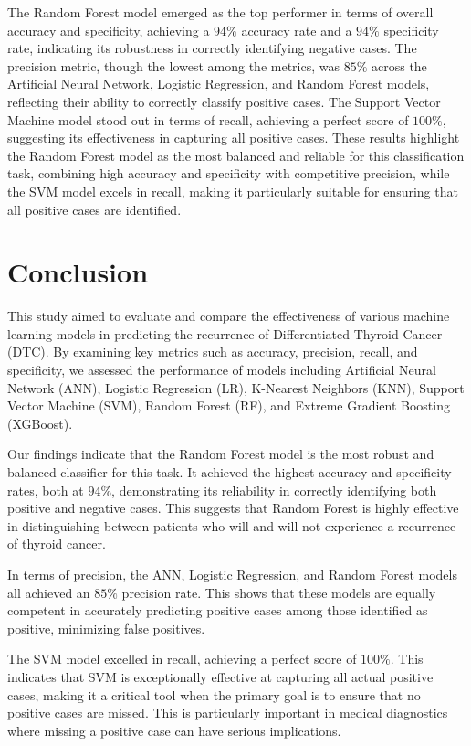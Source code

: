 \documentclass[
  letterpaper,
  DIV=11,
  numbers=noendperiod]{scrartcl}
\begin{document}
The Random Forest model emerged as the top performer in terms of overall
accuracy and specificity, achieving a \(94\%\) accuracy rate and a
\(94\%\) specificity rate, indicating its robustness in correctly
identifying negative cases. The precision metric, though the lowest
among the metrics, was \(85\%\) across the Artificial Neural Network,
Logistic Regression, and Random Forest models, reflecting their ability
to correctly classify positive cases. The Support Vector Machine model
stood out in terms of recall, achieving a perfect score of \(100\%\),
suggesting its effectiveness in capturing all positive cases. These
results highlight the Random Forest model as the most balanced and
reliable for this classification task, combining high accuracy and
specificity with competitive precision, while the SVM model excels in
recall, making it particularly suitable for ensuring that all positive
cases are identified.

\section{Conclusion}\label{conclusion}

This study aimed to evaluate and compare the effectiveness of various
machine learning models in predicting the recurrence of Differentiated
Thyroid Cancer (DTC). By examining key metrics such as accuracy,
precision, recall, and specificity, we assessed the performance of
models including Artificial Neural Network (ANN), Logistic Regression
(LR), K-Nearest Neighbors (KNN), Support Vector Machine (SVM), Random
Forest (RF), and Extreme Gradient Boosting (XGBoost).

Our findings indicate that the Random Forest model is the most robust
and balanced classifier for this task. It achieved the highest accuracy
and specificity rates, both at \(94\%\), demonstrating its reliability
in correctly identifying both positive and negative cases. This suggests
that Random Forest is highly effective in distinguishing between
patients who will and will not experience a recurrence of thyroid
cancer.

In terms of precision, the ANN, Logistic Regression, and Random Forest
models all achieved an \(85\%\) precision rate. This shows that these
models are equally competent in accurately predicting positive cases
among those identified as positive, minimizing false positives.

The SVM model excelled in recall, achieving a perfect score of
\(100\%\). This indicates that SVM is exceptionally effective at
capturing all actual positive cases, making it a critical tool when the
primary goal is to ensure that no positive cases are missed. This is
particularly important in medical diagnostics where missing a positive
case can have serious implications.
\end{document}

